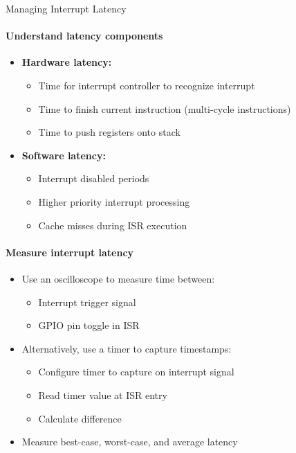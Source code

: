 \begin{KR}{Managing Interrupt Latency}\\
\paragraph{Understand latency components}
\begin{itemize}
    \item \textbf{Hardware latency:}
    \begin{itemize}
        \item Time for interrupt controller to recognize interrupt
        \item Time to finish current instruction (multi-cycle instructions)
        \item Time to push registers onto stack
    \end{itemize}
    \item \textbf{Software latency:}
    \begin{itemize}
        \item Interrupt disabled periods
        \item Higher priority interrupt processing
        \item Cache misses during ISR execution
    \end{itemize}
\end{itemize}

\paragraph{Measure interrupt latency}
\begin{itemize}
    \item Use an oscilloscope to measure time between:
    \begin{itemize}
        \item Interrupt trigger signal
        \item GPIO pin toggle in ISR
    \end{itemize}
    \item Alternatively, use a timer to capture timestamps:
    \begin{itemize}
        \item Configure timer to capture on interrupt signal
        \item Read timer value at ISR entry
        \item Calculate difference
    \end{itemize}
    \item Measure best-case, worst-case, and average latency
\end{itemize}


\end{KR}
